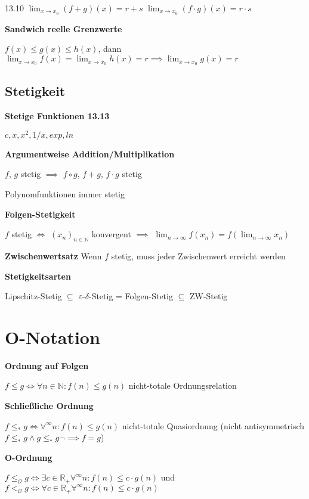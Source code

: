 \documentclass[a4paper,10pt]{article}
\newcommand{\N}{\mathbb{N}}
\newcommand{\natnum}{\mathbb{N}}
\newcommand{\realnum}{\mathbb{R}}
\newcommand{\lt}{<}
\renewcommand{\epsilon}{\varepsilon}
\newcommand{\bigOSymbol}{\mathcal{O}}
\begin{document}
\begin{multicols}{3}
13.10 $\lim_{x \rightarrow x_0} (f+g)(x) = r+s$
$\lim_{x \rightarrow x_0} (f \cdot g)(x) = r \cdot s$

\textbf{Sandwich reelle Grenzwerte}

$f(x) \leq g(x) \leq h(x)$, dann $\lim_{x \rightarrow x_0} f(x) = \lim_{x \rightarrow x_0} h(x)=r \implies \lim_{x \rightarrow x_0} g(x)=r$

\subsection{Stetigkeit}

\textbf{Stetige Funktionen 13.13}

$c, x, x^2, 1/x, exp, ln$

\textbf{Argumentweise Addition/Multiplikation}

$f$, $g$ stetig $\implies$ $f \circ g$, $f+g$, $f\cdot g$ stetig

Polynomfunktionen immer stetig

\textbf{Folgen-Stetigkeit}

$f$ stetig $\iff$ $(x_n)_{n\in\N}$ konvergent $\implies$ $\lim_{n \rightarrow \infty} f(x_n) = f\left(\lim_{n \rightarrow \infty} x_n \right)$

\textbf{Zwischenwertsatz} Wenn $f$ stetig, muss jeder Zwischenwert erreicht werden

\textbf{Stetigkeitsarten}

Lipschitz-Stetig $\subseteq$ $\epsilon$-$\delta$-Stetig = Folgen-Stetig $\subseteq$ ZW-Stetig 

\section{O-Notation}

\textbf{Ordnung auf Folgen}

$f \leq g \Leftrightarrow \forall n \in \natnum: f(n) \leq g(n)$ nicht-totale Ordnungsrelation

\textbf{Schließliche Ordnung}

$f \leq_* g \Leftrightarrow \forall^\infty n: f(n) \leq g(n)$ nicht-totale Quasiordnung (nicht antisymmetrisch $f\leq_* g \land g \leq_* g \neg\implies f=g$)

\textbf{O-Ordnung}

$f \leq_{\bigOSymbol} g \Leftrightarrow \exists c \in \realnum_+ \forall^\infty n: f(n) \leq c \cdot g(n)$ und $f \lt_{\bigOSymbol} g \Leftrightarrow \forall c \in \realnum_+ \forall^\infty n: f(n) \leq c \cdot g(n)$


\end{multicols}
\end{document}
